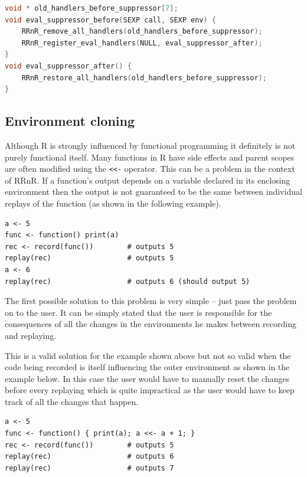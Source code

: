 \documentclass[thesis=M,english,hidelinks]{FITthesis}[2012/10/20]
\begin{document}
\begin{lstlisting}[style=filestyle, language=C, caption={Implementation of the suppressors}]
void * old_handlers_before_suppressor[7];
void eval_suppressor_before(SEXP call, SEXP env) {
	RRnR_remove_all_handlers(old_handlers_before_suppressor);
	RRnR_register_eval_handlers(NULL, eval_suppressor_after);
}
void eval_suppressor_after() {
	RRnR_restore_all_handlers(old_handlers_before_suppressor);
}
\end{lstlisting}

		\subsection{Environment cloning}
		Although R is strongly influenced by functional programming it definitely is not purely functional itself. Many functions in R have side effects and parent scopes are often modified using the \lstinline|<<-| operator. This can be a problem in the context of RRnR. If a function's output depends on a variable declared in its enclosing environment then the output is not guaranteed to be the same between individual replays of the function (as shown in the following example).\par
		
\begin{lstlisting}[style=filestyle, caption={Demonstration of manual environment modification problem}]
a <- 5
func <- function() print(a)
rec <- record(func())        # outputs 5
replay(rec)                  # outputs 5
a <- 6
replay(rec)                  # outputs 6 (should output 5)
\end{lstlisting}
		
		The first possible solution to this problem is very simple -- just pass the problem on to the user. It can be simply stated that the user is responsible for the consequences of all the changes in the environments he makes between recording and replaying.\par
		
		This is a valid solution for the example shown above but not so valid when the code being recorded is itself influencing the outer environment as shown in the example below. In this case the user would have to manually reset the changes before every replaying which is quite impractical as the user would have to keep track of all the changes that happen.\par
		
\begin{lstlisting}[style=filestyle, caption={Demonstration of inherent environment modification problem}]
a <- 5
func <- function() { print(a); a <<- a + 1; }
rec <- record(func())        # outputs 5
replay(rec)                  # outputs 6
replay(rec)                  # outputs 7
\end{lstlisting}
		
\end{document}

